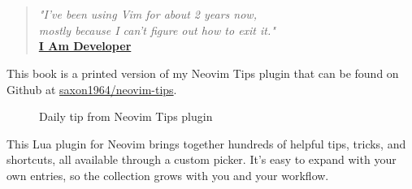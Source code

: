 \chapter*{}
\vspace{-1.5cm}
    \begin{minipage}[r]{.95\textwidth}\raggedleft
    \HUGE\bfseries\IntroductionName
    \end{minipage}
\vspace{2.5cm}

\noindent

\begin{quote}
  {
    \raggedleft
    \textit{"I've been using Vim for about 2 years now,\\mostly because I can't figure out how to exit it."}\\

    \raggedleft
    \textbf{\href{https://x.com/iamdevloper/status/435555976687923200}{I Am Developer}}\\
  }
\end{quote}

This book is a printed version of my Neovim Tips plugin that can be found on Github at
\href{https://github.com/saxon1964/neovim-tips}{saxon1964/neovim-tips}.

\begin{figure}[h]
  \centering
  \vspace{-2em}
  \caption*{Daily tip from Neovim Tips plugin}
\end{figure}

This Lua plugin for Neovim brings together hundreds of helpful tips, tricks, and shortcuts, all available through a custom picker. It's easy to expand with your own entries, so the collection grows with you and your workflow.

